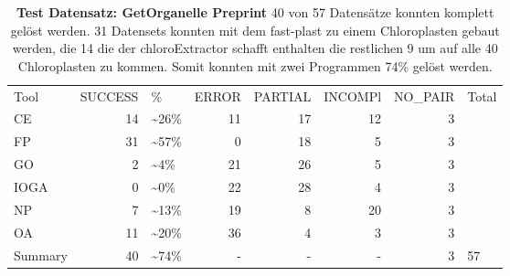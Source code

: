 \documentclass{scrartcl}
\begin{document}
\begin{table}[!h]
\caption[Test Datensatz: GetOrganelle Preprint, 11 Datensätze]{\textbf{Test Datensatz: GetOrganelle Preprint} 40 von 57 Datensätze konnten komplett gelöst werden. 31 Datensets konnten mit dem fast-plast zu einem Chloroplasten gebaut werden, die 14 die der chloroExtractor schafft enthalten die restlichen 9 um auf alle 40 Chloroplasten zu kommen. Somit konnten mit zwei Programmen 74\% gelöst werden.}
\begin{center}
\begin{tabular}{lrlrrrrl}
Tool & SUCCESS & \% & ERROR & PARTIAL & INCOMPl & NO\_PAIR & Total\\
CE & 14 & \textasciitilde{}26\% & 11 & 17 & 12 & 3 & \\
FP & 31 & \textasciitilde{}57\% & 0 & 18 & 5 & 3 & \\
GO & 2 & \textasciitilde{}4\% & 21 & 26 & 5 & 3 & \\
IOGA & 0 & \textasciitilde{}0\% & 22 & 28 & 4 & 3 & \\
NP & 7 & \textasciitilde{}13\% & 19 & 8 & 20 & 3 & \\
OA & 11 & \textasciitilde{}20\% & 36 & 4 & 3 & 3 & \\
Summary & 40 & \textasciitilde{}74\% & - & - & - & 3 & 57\\
\end{tabular}
\end{center}

\end{table}
\end{document}
